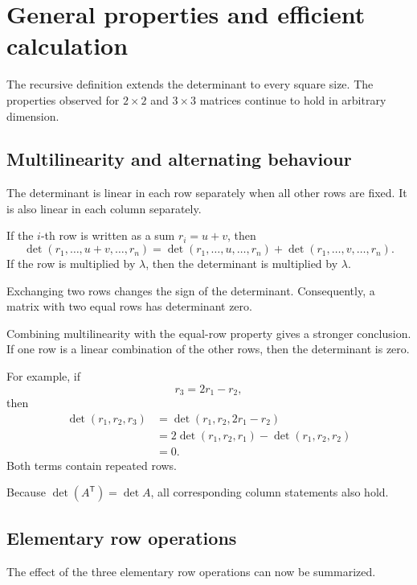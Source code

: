\section{General properties and efficient calculation}

The recursive definition extends the determinant to every square size. The properties observed for \(2\times2\) and \(3\times3\) matrices continue to hold in arbitrary dimension.

\subsection{Multilinearity and alternating behaviour}

\begin{theorembox}
The determinant is linear in each row separately when all other rows are fixed. It is also linear in each column separately.
\end{theorembox}

If the \(i\)-th row is written as a sum \(r_i=u+v\), then
\[
\det(r_1,\ldots,u+v,\ldots,r_n)
=
\det(r_1,\ldots,u,\ldots,r_n)
+
\det(r_1,\ldots,v,\ldots,r_n).
\]
If the row is multiplied by \(\lambda\), then the determinant is multiplied by \(\lambda\).

\begin{theorembox}
Exchanging two rows changes the sign of the determinant. Consequently, a matrix with two equal rows has determinant zero.
\end{theorembox}

Combining multilinearity with the equal-row property gives a stronger conclusion. If one row is a linear combination of the other rows, then the determinant is zero.

For example, if
\[
r_3=2r_1-r_2,
\]
then
\[
\begin{aligned}
\det(r_1,r_2,r_3)
&=\det(r_1,r_2,2r_1-r_2)\\
&=2\det(r_1,r_2,r_1)-\det(r_1,r_2,r_2)\\
&=0.
\end{aligned}
\]
Both terms contain repeated rows.

Because \(\det(A^{\mathsf T})=\det A\), all corresponding column statements also hold.

\subsection{Elementary row operations}

The effect of the three elementary row operations can now be summarized.

